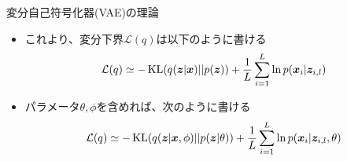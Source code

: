 \documentclass[dvipdfmx,notheorems,t]{beamer}
\begin{document}
\begin{frame}{変分自己符号化器(VAE)の理論}
\begin{itemize}
\begin{itemize}
		\item これより、変分下界$\mathcal{L}(q)$は以下のように書ける
		\begin{equation}
			\mathcal{L}(q) \simeq -\operatorname{KL}(q(\bm{z} | \bm{x}) || p(\bm{z})) + \frac{1}{L} \sum_{i = 1}^L \ln p(\bm{x}_i | \bm{z}_{i, l})
		\end{equation}
		
		\item パラメータ$\theta, \phi$を含めれば、次のように書ける
		\begin{equation}
			\mathcal{L}(q) \simeq -\operatorname{KL}(q(\bm{z} | \bm{x}, \phi) || p(\bm{z} | \theta)) + \frac{1}{L} \sum_{i = 1}^L \ln p(\bm{x}_i | \bm{z}_{i, l}, \theta)
		\end{equation}
	\end{itemize}
\end{itemize}

\end{frame}
\end{document}
